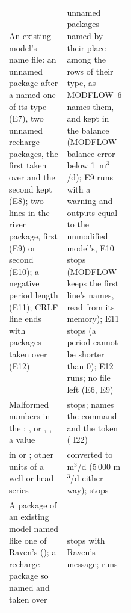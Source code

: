 \begin{table}[!htbp]
\begin{tabularx}{\linewidth}{Y P{0.4\linewidth}}
An existing model's name file: an unnamed package after a named one of its type (E7), two unnamed recharge packages, the first taken over and the second kept (E8); two  lines in the river package,  first (E9) or second (E10); a negative period length (E11); CRLF line ends with packages taken over (E12) & unnamed packages named by their place among the rows of their type, as MODFLOW~6 names them, and kept in the balance (MODFLOW balance error below 1~m$^3$/d); E9 runs with a warning and outputs equal to the unmodified model's, E10 stops (MODFLOW keeps the first line's names, read from its memory); E11 stops (a period cannot be shorter than 0); E12 runs; no  file left (E6, E9)\\
Malformed numbers in the : ,  or , , a  value  & stops; names the command and the token ( I22)\\
 in  or ; other units of a well or head series & converted to m$^3$/d (5\,000 m$^3$/d either way); stops\\
A package of an existing model named like one of Raven's (); a recharge package so named and taken over & stops with Raven's message; runs\\\bottomrule
\end{tabularx}
\end{table}
